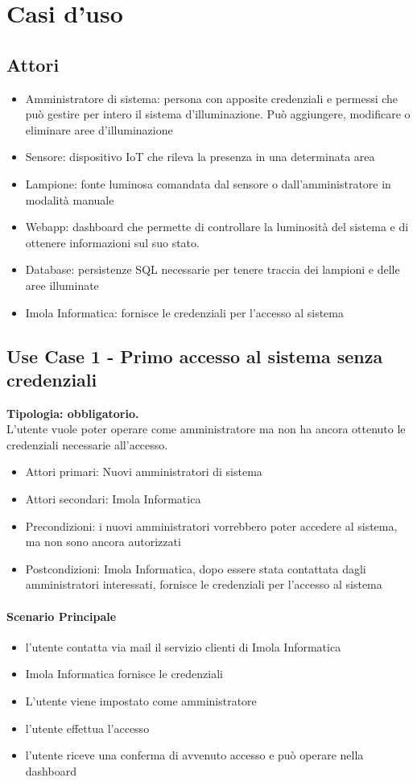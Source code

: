 \documentclass[12pt]{article}
\begin{document}
\section{Casi d'uso}
\subsection{Attori}
\begin{itemize}
	\item Amministratore di sistema: persona con apposite credenziali e permessi che può gestire per intero il sistema d'illuminazione. Può aggiungere, modificare o eliminare aree d'illuminazione
	\item Sensore: dispositivo IoT che rileva la presenza in una determinata area
	\item Lampione: fonte luminosa comandata dal sensore o dall'amministratore in modalità manuale
	\item Webapp: dashboard che permette di controllare la luminosità del sistema e di ottenere informazioni sul suo stato.
	\item Database: persistenze SQL necessarie per tenere traccia dei lampioni e delle aree illuminate
	\item Imola Informatica: fornisce le credenziali per l'accesso al sistema
\end{itemize}
\pagebreak

\subsection{Use Case 1 - Primo accesso al sistema senza credenziali}
\textbf{Tipologia: obbligatorio.} \\
L'utente vuole poter operare come amministratore ma non ha ancora ottenuto le credenziali necessarie all'accesso.
\begin{itemize}
	\item Attori primari: Nuovi amministratori di sistema
	\item Attori secondari: Imola Informatica
	\item Precondizioni: i nuovi amministratori vorrebbero poter accedere al sistema, ma non sono ancora autorizzati
	\item Postcondizioni: Imola Informatica, dopo essere stata contattata dagli amministratori interessati, fornisce le credenziali per l'accesso al sistema
\end{itemize}
\paragraph{Scenario Principale}
\begin{itemize}
	\item l'utente contatta via mail il servizio clienti di Imola Informatica
	\item Imola Informatica fornisce le credenziali
	\item L'utente viene impostato come amministratore
	\item l'utente effettua l'accesso
	\item l'utente riceve una conferma di avvenuto accesso e può operare nella dashboard
\end{itemize}
\end{document}
